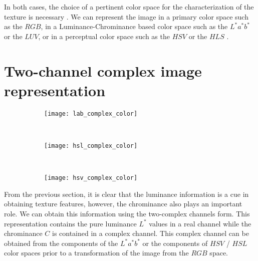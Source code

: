 
In both cases, the choice of a pertinent color space for the characterization of the texture is necessary \citep{Qazi.Alata.ea:PR:2011}. We can represent the image in a primary color space such as the $RGB$, in a Luminance-Chrominance based color space such as the $L^*a^*b^*$ or the $LUV$, or in a perceptual color space such as the $HSV$ or the $HLS$ \citep{Hanbury:IA:2003}. 





\section{Two-channel complex image representation}
\begin{figure}[!ht] 
	\centering
	\begin{subfigure}[b]{0.48\textwidth}
		\centering
		\texttt{[image: lab\_complex\_color]}
		\caption{}	
		\label{fig:hsl_complex_color}
	\end{subfigure}
	~%
	\begin{subfigure}[b]{0.48\textwidth}
		\centering
		\texttt{[image: hsl\_complex\_color]}
		\caption{}	
		\label{fig:hsv_complex_color}
	\end{subfigure}
	~%
	\begin{subfigure}[b]{0.48\textwidth}
		\centering
		\texttt{[image: hsv\_complex\_color]}
		\caption{ }	
		\label{fig:hsv_complex_color}
	\end{subfigure}
	
	\caption{}
	\label{fig:complex_color_spaces}
\end{figure}

From the previous section, it is clear that the luminance information is a cue in obtaining texture features, however, the chrominance also plays an important role. We can obtain this information using the two-complex channels form. This representation contains the pure luminance $L^*$ values in a real channel while the chrominance $C$ is contained in a complex channel. This complex channel can be obtained from the components of the $L^*a^*b^*$ or the components of $HSV$ / $HSL$ color spaces prior to a transformation of the image from the $RGB$ space.

